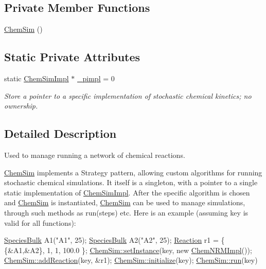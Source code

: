 \subsection*{Private Member Functions}
\begin{DoxyCompactItemize}
\item 
\hyperlink{classChemSim_a7a14b6058861d217c37f1d1f43b85db6}{Chem\+Sim} ()
\end{DoxyCompactItemize}
\subsection*{Static Private Attributes}
\begin{DoxyCompactItemize}
\item 
static \hyperlink{classChemSimImpl}{Chem\+Sim\+Impl} $\ast$ \hyperlink{classChemSim_a925fca4c4b0e800007163500b8b7909d}{\+\_\+pimpl} = 0
\begin{DoxyCompactList}\small\item\em Store a pointer to a specific implementation of stochastic chemical kinetics; no ownership. \end{DoxyCompactList}\end{DoxyCompactItemize}


\subsection{Detailed Description}
Used to manage running a network of chemical reactions. 

\hyperlink{classChemSim}{Chem\+Sim} implements a Strategy pattern, allowing custom algorithms for running stochastic chemical simulations. It itself is a singleton, with a pointer to a single static implementation of \hyperlink{classChemSimImpl}{Chem\+Sim\+Impl}. After the specific algorithm is chosen and \hyperlink{classChemSim}{Chem\+Sim} is instantiated, \hyperlink{classChemSim}{Chem\+Sim} can be used to manage simulations, through such methods as run(steps) etc. Here is an example (assuming key is valid for all functions)\+: 
\begin{DoxyCode}
\hyperlink{classSpeciesBulk}{SpeciesBulk} A1(\textcolor{stringliteral}{"A1"},  25);
\hyperlink{classSpeciesBulk}{SpeciesBulk} A2(\textcolor{stringliteral}{"A2"}, 25);
\hyperlink{classReaction}{Reaction} r1 = \{ \{&A1,&A2\}, 1, 1, 100.0 \};
\hyperlink{classChemSim_a0f8a949bc07480c36b590128180e56e7}{ChemSim::setInstance}(key, \textcolor{keyword}{new} \hyperlink{classChemNRMImpl}{ChemNRMImpl}());
\hyperlink{classChemSim_a7ef2b5545a5250201b96c666b5ba6f92}{ChemSim::addReaction}(key, &r1);
\hyperlink{classChemSim_affbdef9382a7c693a08f03f19e60d7fb}{ChemSim::initialize}(key);
\hyperlink{classChemSim_a60bf7095bcc35a4865a2bb191b070fc9}{ChemSim::run}(key)
\end{DoxyCode}
 

